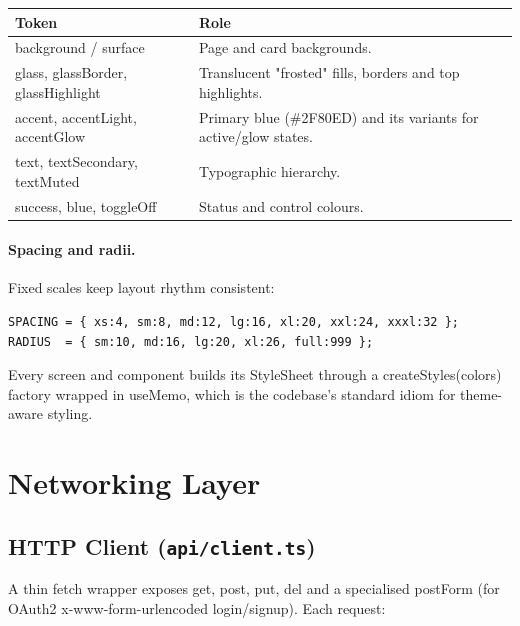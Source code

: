 \documentclass[11pt,a4paper]{article}
\newcommand{\code}[1]{\colorbox{codebg}{\ttfamily\small #1}}
\begin{document}
\begin{longtable}{@{}p{}p{}@{}}
  \toprule
  \textbf{Token} & \textbf{Role} \\
  \midrule
  \endhead
  \code{background} / \code{surface} & Page and card backgrounds. \\
  \code{glass}, \code{glassBorder}, \code{glassHighlight} & Translucent
    "frosted" fills, borders and top highlights. \\
  \code{accent}, \code{accentLight}, \code{accentGlow} & Primary blue
    (\#2F80ED) and its variants for active/glow states. \\
  \code{text}, \code{textSecondary}, \code{textMuted} & Typographic hierarchy. \\
  \code{success}, \code{blue}, \code{toggleOff} & Status and control colours. \\
  \bottomrule
\end{longtable}

\paragraph{Spacing and radii.} Fixed scales keep layout rhythm consistent:

\begin{lstlisting}[language=tsx]
SPACING = { xs:4, sm:8, md:12, lg:16, xl:20, xxl:24, xxxl:32 };
RADIUS  = { sm:10, md:16, lg:20, xl:26, full:999 };
\end{lstlisting}

Every screen and component builds its \code{StyleSheet} through a
\code{createStyles(colors)} factory wrapped in \code{useMemo}, which is the
codebase's standard idiom for theme-aware styling.

\section{Networking Layer}

\subsection{HTTP Client (\texttt{api/client.ts})}

A thin \code{fetch} wrapper exposes \code{get}, \code{post}, \code{put},
\code{del} and a specialised \code{postForm} (for OAuth2
\code{x-www-form-urlencoded} login/signup). Each request:
\end{document}
